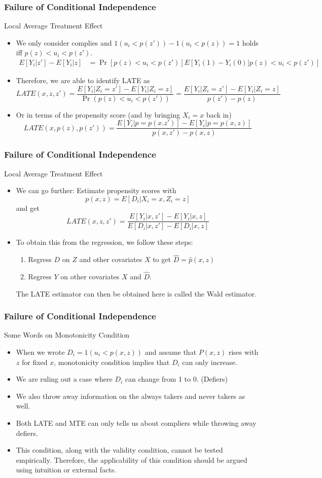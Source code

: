 \documentclass{beamer}
\begin{document}
\begin{frame}
\frametitle{Failure of Conditional Independence}
Local Average Treatment Effect
\begin{itemize}
\item We only consider complies and $1(u_i<p(z'))-1(u_i<p(z))=1$ holds iff $p(z)<u_i<p(z')$. 
 \footnotesize{\begin{align*}
E[Y_i|z']-E[Y_i|z]&=\Pr[p(z)<u_i<p(z')]E[Y_i(1)-Y_i(0)|p(z)<u_i<p(z')]
\end{align*}}\normalsize
\item Therefore, we are able to identify LATE as
\footnotesize{\[
LATE(x, z,z')=\frac{E[Y_i|Z_i=z']-E[Y_i|Z_i=z]}{\Pr(p(z)<u_i<p(z'))}=\frac{E[Y_i|Z_i=z']-E[Y_i|Z_i=z]}{p(z')-p(z)}
\]}\normalsize
\item Or in terms of the propensity score (and by bringing $X_i=x$ back in)
\[
LATE(x, p(z),p(z'))=\frac{E[Y_i|p=p(x.z')]-E[Y_i|p=p(x,z)]}{p(x,z')-p(x,z)}
\]
\end{itemize}
\end{frame}

\begin{frame}
\frametitle{Failure of Conditional Independence}
Local Average Treatment Effect
\begin{itemize}

\item We can go further: Estimate propensity scores with
\[
p(x,z)=E[D_i|X_i=x, Z_i=z]
\]
and get
\[
LATE(x, z,z')=\frac{E[Y_i|x,z']-E[Y_i|x,z]}{E[D_i|x,z']-E[D_i|x,z]}
\]
\item To obtain this from the regression, we follow these steps:
\begin{enumerate}
\item Regress $D$ on $Z$ and other covariates $X$ to get $\hat{D}=\hat{p}(x,z)$
\item Regress $Y$ on other covariates $X$ and $\hat{D}$.
\end{enumerate}
The LATE estimator can then be obtained here is called the Wald estimator. 
\end{itemize}
\end{frame}

\begin{frame}
\frametitle{Failure of Conditional Independence}
Some Words on Monotonicity Condition
\begin{itemize}
\item When we wrote $D_i=1(u_i<p(x,z))$ and assume that $P(x,z)$ rises with $z$ for fixed $x$, monotonicity condition implies that $D_i$ can only increase.
\item We are ruling out a case where $D_i$ can change from 1 to 0. (Defiers)
\item We also throw away information on the always takers and never takers as well. 
\item Both LATE and MTE can only tells us about compliers while throwing away defiers. 
\item This condition, along with the validity condition, cannot be tested empirically.  Therefore, the applicability of this condition should be argued using intuition or external facts. 
\end{itemize}
\end{frame}
\end{document}
